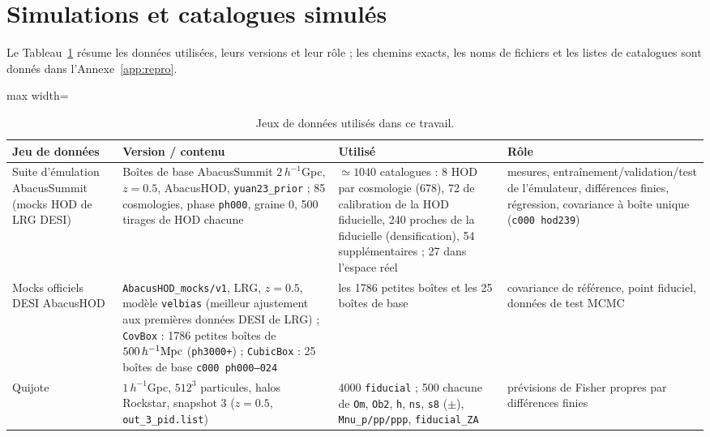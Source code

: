 \section{Simulations et catalogues simulés}
\label{sec:sims}

Le Tableau~\ref{tab:datasets} résume les données utilisées, leurs versions et leur rôle ; les chemins exacts, les noms de fichiers et les listes de catalogues sont donnés dans l'Annexe~\ref{app:repro}.

\begin{table}[!tp]
\centering\small
\begin{adjustbox}{max width=\textwidth}
\begin{tabular}{p{3.3cm}p{4.6cm}p{4.3cm}p{4.3cm}}
\toprule
Jeu de données & Version / contenu & Utilisé & Rôle \\
\midrule
Suite d'émulation AbacusSummit (mocks HOD de LRG DESI) & Boîtes de base AbacusSummit $2\,h^{-1}$Gpc, $z=0.5$, AbacusHOD, \texttt{yuan23\_prior} ; 85 cosmologies, phase \texttt{ph000}, graine 0, 500 tirages de HOD chacune & $\simeq1040$ catalogues : 8 HOD par cosmologie (678), 72 de calibration de la HOD fiducielle, 240 proches de la fiducielle (densification), 54 supplémentaires ; 27 dans l'espace réel & mesures, entraînement/validation/test de l'émulateur, différences finies, régression, covariance à boîte unique (\texttt{c000 hod239}) \\
Mocks officiels DESI AbacusHOD & \texttt{AbacusHOD\_mocks/v1}, LRG, $z=0.5$, modèle \texttt{velbias} (meilleur ajustement aux premières données DESI de LRG) ; \texttt{CovBox} : 1786 petites boîtes de $500\,h^{-1}\mathrm{Mpc}$ (\texttt{ph3000+}) ; \texttt{CubicBox} : 25 boîtes de base \texttt{c000 ph000--024} & les 1786 petites boîtes et les 25 boîtes de base & covariance de référence, point fiduciel, données de test MCMC \\
Quijote & $1\,h^{-1}$Gpc, $512^3$ particules, halos Rockstar, snapshot 3 ($z=0.5$, \texttt{out\_3\_pid.list}) & 4000 \texttt{fiducial} ; 500 chacune de \texttt{Om}, \texttt{Ob2}, \texttt{h}, \texttt{ns}, \texttt{s8} ($\pm$), \texttt{Mnu\_p/pp/ppp}, \texttt{fiducial\_ZA} & prévisions de Fisher propres par différences finies \\
\bottomrule
\end{tabular}
\end{adjustbox}
\caption{Jeux de données utilisés dans ce travail.}
\label{tab:datasets}
\end{table}

